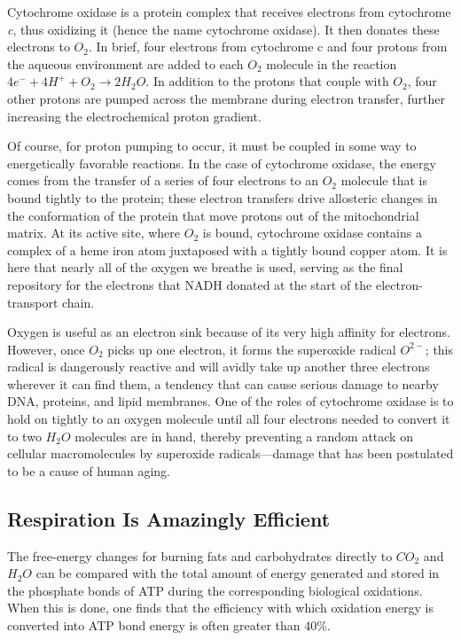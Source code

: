 Cytochrome oxidase is a protein complex that receives electrons from
cytochrome \textit{c}, thus oxidizing it (hence the name cytochrome oxidase).
It then donates these electrons to $O_2$. In brief, four electrons from cytochrome
c and four protons from the aqueous environment are added to
each $O_2$ molecule in the reaction $4e^{-} + 4H^{+} + O_{2} \rightarrow 2H_{2}O$.
In addition to the protons that couple with $O_2$, four other protons are
pumped across the membrane during electron transfer, further increasing
the electrochemical proton gradient.

Of course, for proton pumping to occur, it must be coupled in some way
to energetically favorable reactions. In the case of cytochrome oxidase,
the energy comes from the transfer of a series of four electrons to an
$O_2$ molecule that is bound tightly to the protein; these electron transfers
drive allosteric changes in the conformation of the protein that move
protons out of the mitochondrial matrix. At its active site, where $O_2$ is
bound, cytochrome oxidase contains a complex of a heme iron atom juxtaposed
with a tightly bound copper atom. It is here that
nearly all of the oxygen we breathe is used, serving as the final repository
for the electrons that NADH donated at the start of the electron-transport
chain.

Oxygen is useful as an electron sink because of its very high affinity for
electrons. However, once $O_2$ picks up one electron, it forms the superoxide
radical $O^{2-}$; this radical is dangerously reactive and will avidly take up
another three electrons wherever it can find them, a tendency that can
cause serious damage to nearby DNA, proteins, and lipid membranes.
One of the roles of cytochrome oxidase is to hold on tightly to an oxygen
molecule until all four electrons needed to convert it to two $H_{2}O$
molecules are in hand, thereby preventing a random attack on cellular
macromolecules by superoxide radicals—damage that has been postulated
to be a cause of human aging.

\subsection{Respiration Is Amazingly Efficient}

The free-energy changes for burning fats and carbohydrates directly to
$CO_2$ and $H_{2}O$ can be compared with the total amount of energy generated
and stored in the phosphate bonds of ATP during the corresponding
biological oxidations. When this is done, one finds that the efficiency
with which oxidation energy is converted into ATP bond energy is often
greater than 40\%.

